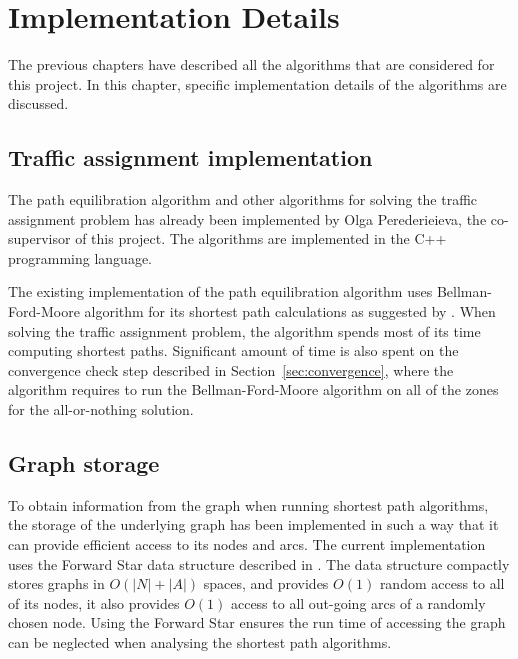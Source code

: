 \chapter{Implementation Details} \label{chap:implementation}
The previous chapters have described all the algorithms that are considered for this project.
In this chapter, specific implementation details of the algorithms are discussed.

\section{Traffic assignment implementation}
The path equilibration algorithm and other algorithms for solving the traffic assignment problem has already been implemented by Olga Perederieieva, the co-supervisor of this project.
The algorithms are implemented in the C++ programming language.

The existing implementation of the path equilibration algorithm uses Bellman-Ford-Moore algorithm for its shortest path calculations as suggested by \citet{Sheffi}.
When solving the traffic assignment problem,
the algorithm spends most of its time computing shortest paths.
Significant amount of time is also spent on the convergence check step described in Section~\ref{sec:convergence},
where the algorithm requires to run the Bellman-Ford-Moore algorithm on all of the zones for the all-or-nothing solution.

\section{Graph storage}
To obtain information from the graph when running shortest path algorithms,
the storage of the underlying graph has been implemented in such a way that it can provide efficient access to its nodes and arcs.
The current implementation uses the Forward Star data structure described in \citet{Sheffi}.
The data structure compactly stores graphs in $O(|N|+|A|)$ spaces,
and provides $O(1)$ random access to all of its nodes,
it also provides $O(1)$ access to all out-going arcs of a randomly chosen node.
Using the Forward Star ensures the run time of accessing the graph can be neglected when analysing the shortest path algorithms.

